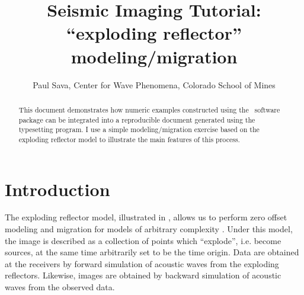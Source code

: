 

\author{Paul Sava, Center for Wave Phenomena, Colorado School of Mines}
\title{Seismic Imaging Tutorial:
  ``exploding reflector'' modeling/migration}
\maketitle

\begin{abstract}
  This document demonstrates how numeric examples constructed using
  the \mg~software package can be integrated into a reproducible
  document generated using the \latex typesetting program. I use a
  simple modeling/migration exercise based on the exploding reflector
  model to illustrate the main features of this process.
\end{abstract}

\section{Introduction}
The exploding reflector model, illustrated in , allows us
to perform zero offset modeling and migration for models of arbitrary
complexity \cite[]{Claerbout.iei.1985}. Under this model, the image is
described as a collection of points which ``explode'', i.e. become
sources, at the same time arbitrarily set to be the time origin. Data
are obtained at the receivers by forward simulation of acoustic waves
from the exploding reflectors. Likewise, images are obtained by
backward simulation of acoustic waves from the observed data.



